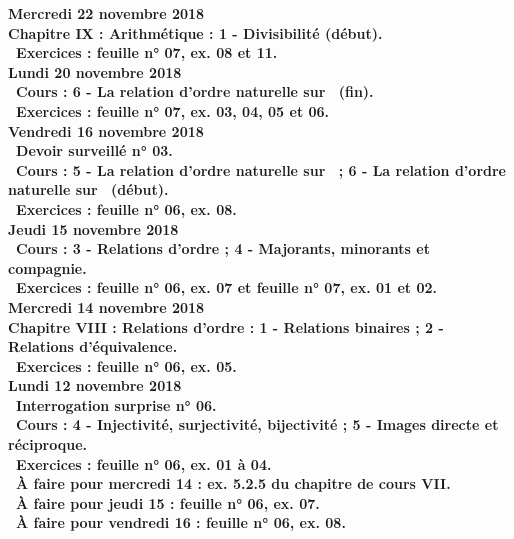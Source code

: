 \documentclass[12pt,a4paper]{article}
\begin{document}
\noindent\textbf{\bf Mercredi 22 novembre 2018}\\
\bf Chapitre IX \rm : Arithmétique : 1 - Divisibilité (début).\\
\bu\ Exercices : feuille n° 07, ex. 08 et 11.\vspace{.4cm}\\
 
\noindent\textbf{Lundi 20 novembre 2018}\\
\bu\ Cours : 6 - La relation d'ordre naturelle sur \R\ (fin).\\
\bu\ Exercices : feuille n° 07, ex. 03, 04, 05 et 06.\vspace{.4cm}\\

\noindent\textbf{Vendredi 16 novembre 2018}\\
\bu\ Devoir surveillé n° 03.\\
\bu\ Cours : 5 - La relation d'ordre naturelle sur \N\ ; 6 - La relation d'ordre naturelle sur \R\ (début).\\
\bu\ Exercices : feuille n° 06, ex. 08.\vspace{.4cm}\\
 
\noindent\textbf{Jeudi 15 novembre 2018}\\
\bu\ Cours : 3 - Relations d'ordre ;  4 - Majorants, minorants et compagnie.\\
\bu\ Exercices : feuille n° 06, ex. 07 et feuille n° 07, ex. 01 et 02.\vspace{.4cm}\\

\noindent\textbf{\bf Mercredi 14 novembre 2018}\\
\bf Chapitre VIII \rm : Relations d'ordre : 1 - Relations binaires ; 2 - Relations d'équivalence.\\
\bu\ Exercices : feuille n° 06, ex. 05.\vspace{.4cm}\\
 
\noindent\textbf{Lundi 12 novembre 2018}\\
\bu\ Interrogation surprise n° 06.\\
\bu\ Cours : 4 - Injectivité, surjectivité, bijectivité ; 5 - Images directe et réciproque.\\
\bu\ Exercices : feuille n° 06, ex. 01 à 04.\\
\bu\ À faire pour mercredi 14 : ex. 5.2.5 du chapitre de cours VII.\\
\bu\ À faire pour jeudi 15 : feuille n° 06, ex. 07.\\
\bu\ À faire pour vendredi 16 : feuille n° 06, ex. 08.\vspace{.4cm}\\
\end{document}
